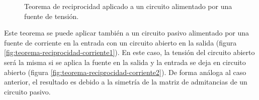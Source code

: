 \begin{figure}[H]
  \centering
  \hspace{2cm}
  \caption{Teorema de reciprocidad aplicado a un circuito alimentado por una fuente de tensión.}
  \label{fig:teorema-reciprocidad-tension}
\end{figure}

Este teorema se puede aplicar también a un circuito pasivo alimentado por una fuente de corriente en la entrada con un circuito abierto en la salida (figura \ref{fig:teorema-reciprocidad-corriente1}). En este caso, la tensión del circuito abierto será la misma si se aplica la fuente en la salida y la entrada se deja en circuito abierto (figura \ref{fig:teorema-reciprocidad-corriente2}). De forma análoga al caso anterior, el resultado es debido a la simetría de la matriz de admitancias de un circuito pasivo.

